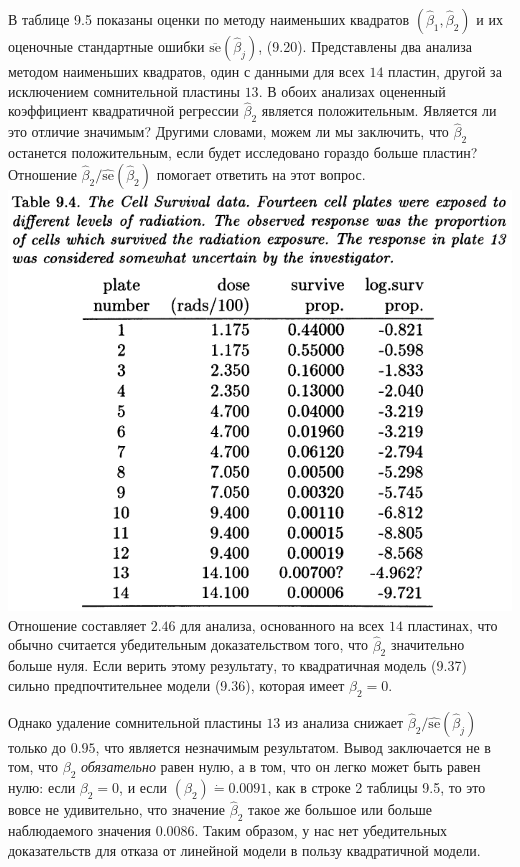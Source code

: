 В таблице 9.5 показаны оценки по методу наименьших квадратов $(\hat{\beta}_1, \hat{\beta}_2)$ и их оценочные стандартные ошибки $\overline{\text{se}}(\hat{\beta}_j)$, (9.20). Представлены два анализа методом наименьших квадратов, один с данными для всех $14$ пластин, другой за исключением сомнительной пластины $13$. В обоих анализах оцененный коэффициент квадратичной регрессии $\hat{\beta}_2$ является положительным. Является ли это отличие значимым? Другими словами, можем ли мы заключить, что $\hat{\beta}_2$ останется положительным, если будет исследовано гораздо больше пластин? Отношение $\hat{\beta}_2/\widehat{\text{se}}(\hat{\beta}_2)$ помогает ответить на этот вопрос.
\\[0.5cm] 
\noindent
\includegraphics[width=\linewidth]{9/t94}
\newline
Отношение составляет $2.46$ для анализа, основанного на всех $14$ пластинах, что обычно считается убедительным доказательством того, что $\hat{\beta}_2$ значительно больше нуля. Если верить этому результату, то квадратичная модель (9.37) сильно предпочтительнее модели (9.36), которая имеет $\beta_2 = 0$.

Однако удаление сомнительной пластины $13$ из анализа снижает $\hat{\beta}_2/\widehat{\text{se}}(\hat{\beta}_j)$ только до $0.95$, что является незначимым результатом. Вывод заключается не в том, что $\beta_2$ \textit{обязательно} равен нулю, а в том, что он легко может быть равен нулю: если $\beta_2 = 0$, и если $(\beta_2) \dot = 0.0091$, как в строке 2 таблицы 9.5, то это вовсе не удивительно, что значение $\hat{\beta}_2$ такое же большое или больше наблюдаемого значения $0.0086$. Таким образом, у нас нет убедительных доказательств для отказа от линейной модели в пользу квадратичной модели.

